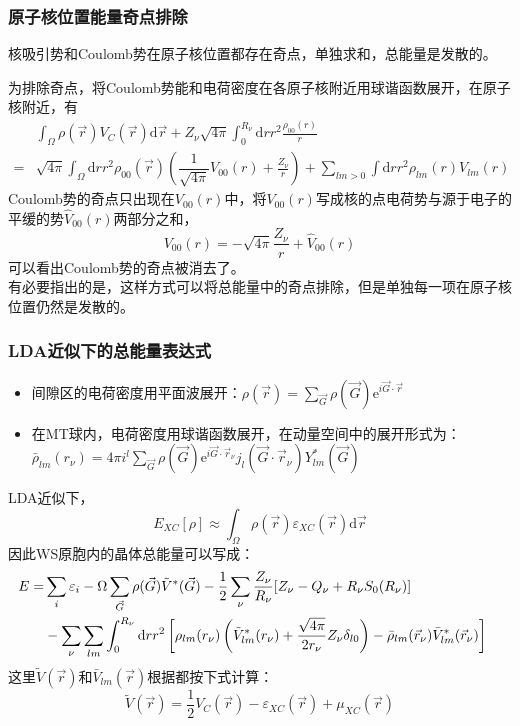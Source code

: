 \documentclass[cjk,slidestop,compress,mathserif,blue]{beamer}
\begin{document}
\frame
{
\frametitle{原子核位置能量奇点排除}
核吸引势和\textrm{Coulomb}势在原子核位置都存在奇点，单独求和，总能量是发散的。

为排除奇点，将\textrm{Coulomb}势能和电荷密度在各原子核附近用球谐函数展开，在原子核附近，有
{\footnotesize\begin{displaymath}
  \begin{split}
    &\int_{\Omega}\rho(\vec r)V_C(\vec r)\mathrm{d}\vec r+Z_{\nu}\sqrt{4\pi}\int_0^{R_{\nu}}\mathrm{d}rr^2\frac{\rho_{00}(r)}r\\
    =&\sqrt{4\pi}\int_{\Omega}\mathrm{d}rr^2\rho_{00}(\vec r)\left(\dfrac1{\sqrt{4\pi}}V_{00}(r)+\frac{Z_{\nu}}r\right)+\sum_{lm>0}\int\mathrm{d}rr^2\rho_{lm}(r)V_{lm}(r)
  \end{split}
\end{displaymath}}
\textrm{Coulomb}势的奇点只出现在$V_{00}(r)$中，将$V_{00}(r)$写成核的点电荷势与源于电子的平缓的势$\hat V_{00}(r)$两部分之和，
\footnotesize{$$V_{00}(r)=-\sqrt{4\pi}\frac{Z_{\nu}}r+\hat V_{00}(r)$$}
可以看出\textrm{Coulomb}势的奇点被消去了。\\有必要指出的是，这样方式可以将总能量中的奇点排除，但是单独每一项在原子核位置仍然是发散的。
}
\frame
{
\frametitle{LDA近似下的总能量表达式}
\begin{itemize}
	\item 间隙区的电荷密度用平面波展开：\footnotesize{$\rho(\vec r)=\sum\limits_{\vec G}\rho(\vec G)\mathrm{e}^{i\vec G\cdot\vec r}$}
	\item 在\textrm{MT}球内，电荷密度用球谐函数展开，在动量空间中的展开形式为：\footnotesize{$\bar\rho_{lm}(r_{\nu})=4\pi i^l\sum\limits_{\vec G}\rho(\vec G)\mathrm{e}^{i\vec G\cdot\vec r_{\nu}}j_l(\vec G\cdot\vec r_{\nu})Y_{lm}^{\ast}(\vec G)$}
\end{itemize}
\textrm{LDA}近似下，\footnotesize{$$E_{XC}[\rho]\approx\int_{\Omega}\rho(\vec r)\varepsilon_{XC}(\vec r)\textrm{d}\vec r$$}
因此\textrm{WS}原胞内的晶体总能量可以写成：
{\footnotesize
\begin{displaymath}
  \begin{split}
\hskip -10pt	  E=&\sum_i\varepsilon_i-\Omega\sum_{\vec G}\rho(\vec G)\tilde V^{\ast}(\vec G)-\frac12\sum_{\nu}\dfrac{Z_{\nu}}{R_{\nu}}[Z_{\nu}-Q_{\nu}+R_{\nu}S_0(R_{\nu})]\\
    &-\sum_{\nu}\sum_{lm}\int_0^{R_{\nu}}\mathrm{d}rr^2\left[\rho_{lm}(r_{\nu})\left(\tilde V_{lm}^{\ast}(r_{\nu})+\dfrac{\sqrt{4\pi}}{2r_{\nu}}Z_{\nu}\delta_{l0}\right)-\bar\rho_{lm}(\vec r_{\nu})\bar V_{lm}^{\ast}(\vec r_{\nu})\right]
  \end{split}
  \label{eq:solid-83}
\end{displaymath}}
这里$\tilde V(\vec r)$和$\bar V_{lm}(\vec r)$根据都按下式计算：
\footnotesize{$$\tilde V(\vec r)=\frac12V_C(\vec r)-\varepsilon_{XC}(\vec r)+\mu_{XC}(\vec r)$$}
}
\end{document}
